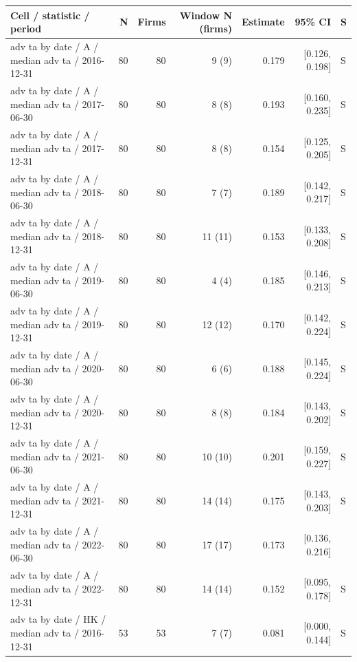 \begingroup\scriptsize\setlength{\tabcolsep}{3pt}
\begin{threeparttable}
\begin{tabular}{p{5.7cm}rrrrrl}
\toprule
Cell / statistic / period & N & Firms & Window N (firms) & Estimate & 95\% CI & S \\
\midrule
adv ta by date / A / median adv ta / 2016-12-31 & 80 & 80 & 9 (9) & 0.179 & [0.126, 0.198] & S \\
adv ta by date / A / median adv ta / 2017-06-30 & 80 & 80 & 8 (8) & 0.193 & [0.160, 0.235] & S \\
adv ta by date / A / median adv ta / 2017-12-31 & 80 & 80 & 8 (8) & 0.154 & [0.125, 0.205] & S \\
adv ta by date / A / median adv ta / 2018-06-30 & 80 & 80 & 7 (7) & 0.189 & [0.142, 0.217] & S \\
adv ta by date / A / median adv ta / 2018-12-31 & 80 & 80 & 11 (11) & 0.153 & [0.133, 0.208] & S \\
adv ta by date / A / median adv ta / 2019-06-30 & 80 & 80 & 4 (4) & 0.185 & [0.146, 0.213] & S \\
adv ta by date / A / median adv ta / 2019-12-31 & 80 & 80 & 12 (12) & 0.170 & [0.142, 0.224] & S \\
adv ta by date / A / median adv ta / 2020-06-30 & 80 & 80 & 6 (6) & 0.188 & [0.145, 0.224] & S \\
adv ta by date / A / median adv ta / 2020-12-31 & 80 & 80 & 8 (8) & 0.184 & [0.143, 0.202] & S \\
adv ta by date / A / median adv ta / 2021-06-30 & 80 & 80 & 10 (10) & 0.201 & [0.159, 0.227] & S \\
adv ta by date / A / median adv ta / 2021-12-31 & 80 & 80 & 14 (14) & 0.175 & [0.143, 0.203] & S \\
adv ta by date / A / median adv ta / 2022-06-30 & 80 & 80 & 17 (17) & 0.173 & [0.136, 0.216] &  \\
adv ta by date / A / median adv ta / 2022-12-31 & 80 & 80 & 14 (14) & 0.152 & [0.095, 0.178] & S \\
adv ta by date / HK / median adv ta / 2016-12-31 & 53 & 53 & 7 (7) & 0.081 & [0.000, 0.144] & S \\
\bottomrule
\end{tabular}
\begin{tablenotes}[flushleft]\footnotesize

\end{tablenotes}
\end{threeparttable}
